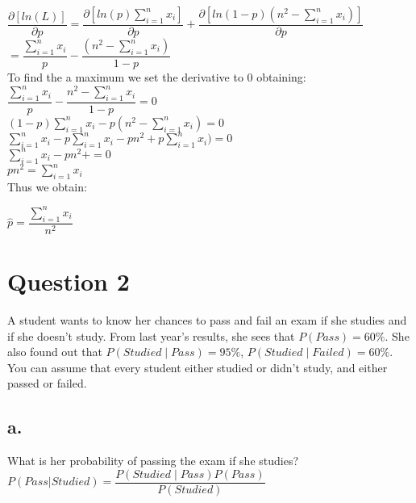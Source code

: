 \documentclass[12pt]{article}
\begin{document}
$\dfrac{\partial[ln(L) ]}{\partial p} = \dfrac{\partial[ ln(p) \sum^{n}_{i = 1} x_i  ]}{\partial p} + \dfrac{\partial[ ln( 1-p) (n^2 - \sum^{n}_{i = 1} x_i)]}{\partial p} $ \\ 

$ = \dfrac{\sum^{n}_{i = 1} x_i  }{p} - \dfrac{ (n^2 - \sum^{n}_{i = 1} x_i) }{1 - p} $ \\

To find the a maximum we set the derivative to 0 obtaining: \\

$  \dfrac{\sum^{n}_{i = 1} x_i  }{p} - \dfrac{ n^2 - \sum^{n}_{i = 1} x_i }{1 - p} = 0 $ \\

$ (1-p)\sum^{n}_{i = 1} x_i - p (n^2 - \sum^{n}_{i = 1} x_i) = 0 $ \\

$ \sum^{n}_{i = 1} x_i  - p\sum^{n}_{i = 1} x_i - pn^2 + p \sum^{n}_{i = 1} x_i) = 0 $ \\

$ \sum^{n}_{i = 1} x_i  - pn^2 + = 0 $ \\

$ pn^2 = \sum^{n}_{i = 1} x_i  $ \\

Thus we obtain: 

\begin{center}
$ \hat{p} = \dfrac{\sum^{n}_{i = 1} x_i}{n^2} $
\end{center}



\newpage
\section*{Question 2}

A student wants to know her chances to pass and fail an exam if she studies and if she doesn't study.
From last year's results, she sees that
$P(Pass) = 60\%$.
She also found out that 
$P(Studied \mid Pass) = 95\%$, 
$P(Studied \mid Failed) = 60\%$. 
You can assume that every student either studied or didn't study, and either passed or failed.

\subsection*{a.}
What is her probability of passing the exam if she studies?\\

$P(Pass| Studied) = \dfrac{P(Studied \mid Pass)P(Pass)}{P(Studied)}$
\end{document}

